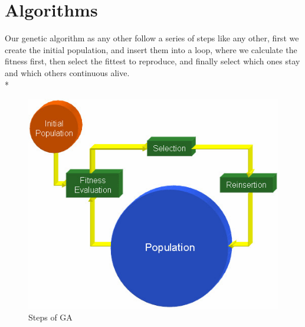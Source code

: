 \documentclass[twocolumn]{IEEEtran}
\begin{document}
\section{Algorithms}
Our genetic algorithm as any other follow a series of steps like any other, first we create the initial
population, and insert them into a loop, where we calculate the fitness first, then select the fittest to reproduce, and finally select which ones stay and which others continuous alive.\\* 
    \begin{figure}[h!]
	\centering
	\includegraphics[width=\columnwidth]{src/GAalg.jpg}
	\caption{Steps of GA}
	\end{figure}
    
\end{document}
